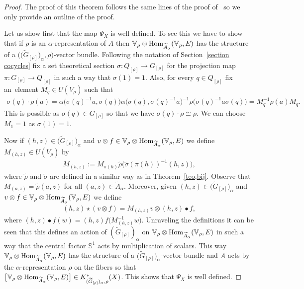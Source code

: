 \documentclass[10pt,a4paper]{amsart}
\def\S{\mathbb{S}}
\def\V{\mathbb{V}}
\DeclareMathOperator{\Hom}{\textup{Hom}}
\theoremstyle{definition}
\numberwithin{equation}{section}
\begin{document}
\begin{proof}
The proof of this theorem follows the same lines of the proof of~\cite[Theorem 3.1]{GomezUribe}
so we only provide an outline of the proof.

Let us show first that the map $\Psi_{X}$ is well defined. To see this we have to
show that if $\rho$ is an $\alpha$-representation of $A$ then
$\V_{\rho}\otimes\Hom_{\widetilde{A}_{\alpha}}(\V_{\rho},E)$
has the structure of a $\big(\big(\widetilde{G}_{[\rho]}\big)_{\alpha},\rho\big)$-vector bundle.
Following the notation of Section~\ref{section cocycles} fix a set theoretical
section $\sigma\colon Q_{[\rho]}\to G_{[\rho]}$ for the projection map $\pi\colon G_{[\rho]}\to Q_{[\rho]}$
in such a way that $\sigma(1)=1$. Also, for every $q\in Q_{[\rho]}$ fix an~element
$M_{q}\in U(V_{\rho})$ such that
\begin{gather*}
\sigma(q)\cdot \rho(a) =\alpha\big(\sigma(q)^{-1}a,\sigma(q)\big)\alpha\big(\sigma(q),\sigma(q)^{-1}a\big)^{-1}
\rho\big(\sigma(q)^{-1}a\sigma(q)\big)=M_{q}^{-1}\rho(a)M_{q}.
\end{gather*}
This is possible as $\sigma(q)\in G_{[\rho]}$ so that we have $\sigma(q)\cdot \rho\cong \rho$.
We can choose $M_{1}=1$ as $\sigma(1)=1$.

Now if $(h,z)\in \big(\widetilde{G}_{[\rho]}\big)_{\alpha}$ and $v\otimes f\in
\V_{\rho}\otimes \Hom_{\widetilde{A}_{\alpha}}(\V_{\rho},E)$
we define $M_{(h,z)}\in U(V_{\rho})$ by
\begin{gather*}
M_{(h,z)}:=M_{\pi(h)}\tilde{\rho}\big(\tilde{\sigma}(\pi(h))^{-1}(h,z)\big),
\end{gather*}
where $\tilde{\rho}$ and $\tilde{\sigma}$ are defined in a similar way as in
Theorem~\ref{teo,bij}. Observe that $M_{(a,z)}=\tilde{\rho}(a,z)$ for all
$(a,z)\in \widetilde{A}_{\alpha}$. Moreover, given $(h,z)\in \big(\widetilde{G}_{[\rho]}\big)_{\alpha}$
and $v\otimes f\in \V_{\rho}\otimes \Hom_{\widetilde{A}_{\alpha}}(\V_{\rho},E)$
we define
\begin{gather*}
(h,z)\star(v\otimes f)=M_{(h,z)}v\otimes (h,z)\bullet f,
\end{gather*}
where $(h,z)\bullet f (w)=(h,z)f\big(M_{(h,z)}^{-1}w\big)$. Unraveling the definitions it
can be seen that this defines an action of
$(\widetilde{G}_{[\rho]})_{\alpha}$ on $\V_{\rho}\otimes \Hom_{\widetilde{A}_{\alpha}}(\V_{\rho},E)$
in such a way that the central factor $\S^{1}$ acts by multiplication of scalars.
This way $\V_{\rho}\otimes \Hom_{\widetilde{A}_{\alpha}}(\V_{\rho},E)$ has the structure
of a $\big(\widetilde{G}_{[\rho]}\big)_{\alpha}$-vector bundle and $A$ acts by the
$\alpha$-representation $\rho$ on the fibers so that
$\big[\V_{\rho}\otimes \Hom_{\widetilde{A}_{\alpha}}(\V_{\rho},E)\big]\in
K^{\ast}_{(\widetilde{G}_{[\rho]})_{\alpha},\rho}(X)$. This shows that
$\Psi_{X}$ is well defined.



\end{proof}
\end{document}
